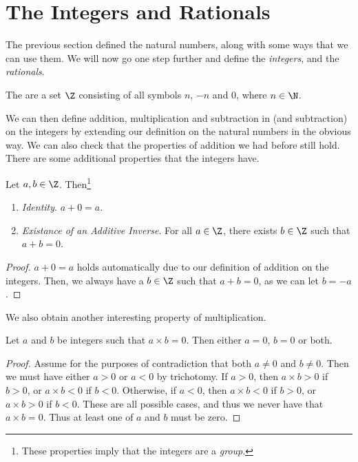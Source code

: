 \documentclass[a4paper]{scrreprt}
\begin{document}
\section{The Integers and Rationals}

The previous section defined the natural numbers, along with some ways that we can use them. We will now go one step further and define the \emph{integers}, and the \emph{rationals}.

\begin{definition}[Integers]
	The  are a set $\Z$ consisting of all symbols $n$, $-n$ and 0, where $n \in \N$. 
\end{definition}

We can then define addition, multiplication and subtraction in (and subtraction) on the integers by extending our definition on the natural numbers in the obvious way. We can also check that the properties of addition we had before still hold. There are some additional properties that the integers have.

\begin{proposition}
	Let $a, b \in \Z$. Then\footnote{These properties imply that the integers are a \emph{group}.}
	\begin{enumerate}[label=(\roman*)]
		\item \emph{Identity}. $a + 0 = a$.
		\item \emph{Existance of an Additive Inverse}. For all $a \in \Z$, there exists $b \in \Z$ such that $a + b = 0$.
	\end{enumerate}
\end{proposition}
\begin{proof}
	$a + 0 = a$ holds automatically due to our definition of addition on the integers. Then, we always have a $b \in \Z$ such that $a + b = 0$, as we can let $b = -a$.
\end{proof}

We also obtain another interesting property of multiplication.

\begin{proposition}
	Let $a$ and $b$ be integers such that $a \times b = 0$. Then either $a = 0$, $b = 0$ or both.
\end{proposition}
\begin{proof}
	Assume for the purposes of contradiction that both $a \neq 0$ and $b \neq 0$. Then we must have either $a > 0$ or $a < 0$ by trichotomy. If $a > 0$, then $a \times b > 0$ if $b > 0$, or $a \times b < 0$ if $b < 0$. Otherwise, if $a < 0$, then $a \times b < 0$ if $b > 0$, or $a \times b > 0$ if $b < 0$. These are all possible cases, and thus we never have that $a \times b = 0$. Thus at least one of $a$ and $b$ must be zero. 
\end{proof}
\end{document}
